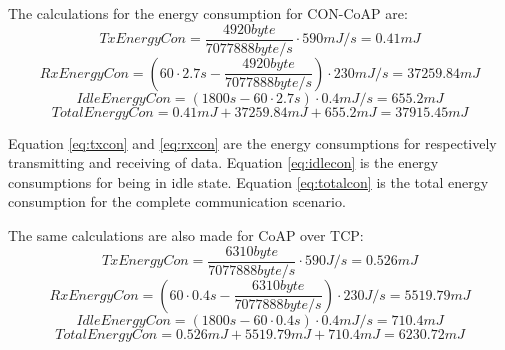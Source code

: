 The calculations for the energy consumption for CON-CoAP are:
\begin{equation}\label{eq:txcon}
TxEnergyCon = \frac{4920 byte}{7077888 byte/s } \cdot 590 mJ/s = 0.41 mJ   
\end{equation}
\begin{equation}\label{eq:rxcon}
RxEnergyCon = (60 \cdot 2.7 s - \frac{4920 byte}{7077888 byte/s }) \cdot 230 mJ/s = 37259.84 mJ   
\end{equation}
\begin{equation}\label{eq:idlecon}
IdleEnergyCon = (1800 s - 60 \cdot 2.7 s) \cdot 0.4 mJ/s = 655.2 mJ   
\end{equation}
\begin{equation}\label{eq:totalcon}
TotalEnergyCon = 0.41 mJ + 37259.84 mJ +655.2 mJ = 37915.45 mJ %
\end{equation}

Equation \ref{eq:txcon} and \ref{eq:rxcon} are the energy consumptions for respectively transmitting and receiving of data. Equation \ref{eq:idlecon} is the energy consumptions for being in idle state.
Equation \ref{eq:totalcon} is the total energy consumption for the complete communication scenario.

The same calculations are also made for CoAP over TCP:
\begin{equation}\label{eq:txtcp}
TxEnergyCon = \frac{6310 byte}{7077888 byte/s } \cdot 590 J/s = 0.526 mJ   
\end{equation}
\begin{equation}\label{eq:rxtcp}
RxEnergyCon = (60 \cdot 0.4 s - \frac{6310 byte}{7077888 byte/s }) \cdot 230 J/s = 5519.79 mJ   
\end{equation}
\begin{equation}\label{eq:idletcp}
IdleEnergyCon = (1800 s - 60 \cdot 0.4 s) \cdot 0.4 mJ/s = 710.4 mJ %
\end{equation}
\begin{equation}\label{eq:totaltcp}
TotalEnergyCon = 0.526 mJ + 5519.79 mJ + 710.4 mJ = 6230.72 mJ 
\end{equation}

